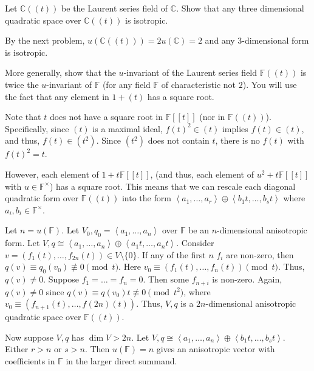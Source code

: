 \documentclass[12 pt, letterpaper]{hmcpset}
\begin{document}
\pagebreak
	

\begin{problem}[(1)]
	Let $\mathbb{C}((t))$ be the Laurent series field of $\mathbb{C}$. Show that any three dimensional quadratic space over $\mathbb{C}((t))$ is isotropic.
\end{problem}

\begin{solution}
	By the next problem, $u(\mathbb{C}((t))) = 2 u(\mathbb{C}) = 2$ and any $3$-dimensional form is isotropic.
\end{solution}

\pagebreak

\begin{problem}[(2)]
	More generally, show that the  $u$-invariant of the Laurent series field $\mathbb{F}((t))$ is twice the $u$-invariant of $\mathbb{F}$ (for any field $\mathbb{F}$ of characteristic not $2$). You will use the fact that any element in $1 + (t)$ has a square root.
\end{problem}

\begin{solution}
	Note that $t$ does not have a square root in $\mathbb{F}[[t]]$ (nor in $\mathbb{F}((t))$). Specifically, since $(t)$ is a maximal ideal, $f(t)^{2} \in (t)$ implies $f(t) \in (t)$, and thus, $f(t) \in (t^{2})$. Since $(t^{2})$ does not contain $t$, there is no $f(t)$ with $f(t)^{2} = t$.

	However, each element of $1 + t \mathbb{F}[[t]]$, (and thus, each element of $u^{2} + t \mathbb{F}[[t]]$ with $u \in \mathbb{F}^{\times}$) has a square root. This means that we can rescale each diagonal quadratic form over $\mathbb{F}((t))$ into the form $\left < a_{1}, \dots, a_{r} \right > \oplus \left < b_{1} t, \dots, b_{s} t \right >$ where $a_{i}, b_{i} \in \mathbb{F}^{\times}$.

	Let $n = u(\mathbb{F})$. Let $V_{0}, q_{0} = \left < a_{1}, \dots, a_{n} \right >$ over $\mathbb{F}$ be an $n$-dimensional anisotropic form. Let $V, q \cong \left < a_{1}, \dots, a_{n} \right > \oplus \left < a_{1} t, \dots, a_{n} t \right >$. Consider $v = (f_{1}(t), \dots, f_{2n}(t)) \in V \setminus \{ 0 \}$. If any of the first $n$ $f_{i}$ are non-zero, then $q(v) \equiv q_{0}(v_{0}) \not \equiv 0 \pmod t$. Here $v_{0} \equiv (f_{1}(t), \dots, f_{n}(t)) \pmod t$. Thus, $q(v) \neq 0$. Suppose $f_{1} = \dots = f_{n} = 0$. Then some $f_{n + i}$ is non-zero. Again, $q(v) \neq 0$ since $q(v) \equiv q(v_{0}) t \not \equiv 0 \pmod t^{2}$, where $v_{0} \equiv (f_{n + 1}(t), \dots, f(2n)(t))$. Thus, $V, q$ is a $2n$-dimensional anisotropic quadratic space over $\mathbb{F}((t))$.

	Now suppose $V, q$ has $\dim V > 2n$. Let $V, q \cong \left < a_{1}, \dots, a_{n} \right > \oplus \left < b_{1} t, \dots, b_{s} t \right >$. Either $r > n$ or $s > n$. Then $u(\mathbb{F}) = n$ gives an anisotropic vector with coefficients in $\mathbb{F}$ in the larger direct summand.
\end{solution}
\end{document}
